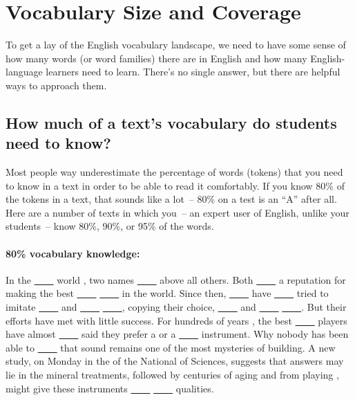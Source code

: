 \section{Vocabulary Size and Coverage} \label{sec:vocab-size-coverage}

To get a lay of the English vocabulary landscape, we need to have some sense of how many words (or word families) there are in English and how many English-language learners need to learn. There's no single answer, but there are helpful ways to approach them.



\subsection*{How much of a text's vocabulary do students need to know?}

Most people way underestimate the percentage of words (tokens) that you need to know in a text in order to be able to read it comfortably. If you know 80\% of the tokens in a text, that sounds like a lot~-- 80\% on a test is an ``A'' after all. Here are a number of texts in which you~-- an expert user of English, unlike your students~-- know 80\%, 90\%, or 95\% of the words.

\begin{mdframed}
\paragraph*{80\% vocabulary knowledge:}In the \uline{~~~~} world , two names \uline{~~~~} above all others. Both \uline{~~~~} a reputation for making the best \uline{~~~~}  \uline{~~~~} in the world. Since then, \uline{~~~~} have \uline{~~~~} tried to imitate \uline{~~~~} and  \uline{~~~~}  \uline{~~~~}, copying their choice, \uline{~~~~} and  \uline{~~~~}  \uline{~~~~}. But their efforts have met with little success. For hundreds of years , the best \uline{~~~~} players have almost \uline{~~~~} said they prefer a or a \uline{~~~~} instrument. Why nobody has been able to \uline{~~~~} that sound remains one of the most mysteries of building. A new study, on Monday in the of the National of Sciences, suggests that answers may lie in the mineral treatments, followed by centuries of aging and from playing , might give these instruments \uline{~~~~}  \uline{~~~~} qualities. 
\end{mdframed}

